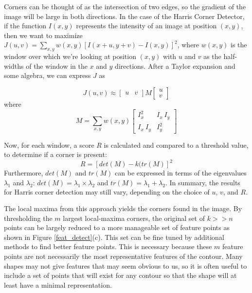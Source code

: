 \documentclass[paper=a4, fontsize=11pt]{scrartcl} %
\begin{document}
Corners can be thought of as the intersection of two edges, so the gradient of the image will be large in both directions. In the case of the Harris Corner Detector, if the function $I(x, y)$ represents the intensity of an image at position $(x, y)$, then we want to maximize $J(u, v) = \sum_{x,y} w(x, y) [I(x+u, y+v) - I(x, y)]^2$, where $w(x, y)$ is the window over which we’re looking at position $(x, y)$ with $u$ and $v$ as the half-widths of the window in the $x$ and $y$ directions. After a Taylor expansion and some algebra, we can express $J$ as 

$$
J(u, v) \approx \begin{bmatrix}
u & v
\end{bmatrix} M \begin{bmatrix}
u\\
v
\end{bmatrix}
$$
where
$$
M = \sum_{x,y} w(x, y) \begin{bmatrix}
I_x^2 & I_x~I_y \\ I_x~I_y & I_y^2
\end{bmatrix}
$$

Now, for each window, a score $R$ is calculated and compared to a threshold value, to determine if a corner is present:
$$
R = [det(M) - k(tr(M)]^2
$$
Furthermore, $det(M)$ and $tr(M)$ can be expressed in terms of the eigenvalues $\lambda_1$ and $\lambda_2$: $det(M) = \lambda_1 \times \lambda_2$ and $tr(M) = \lambda_1 + \lambda_2$. In summary, the results for Harris corner detection may still vary, depending on the choice of $u$, $v$, and $R$.

The local maxima from this approach yields the corners found in the image. By thresholding the $m$ largest local-maxima corners, the original set of $k >> n$ points can be largely reduced to a more manageable set of feature points as shown in Figure \ref{feat_detect}(c). This set can be fine tuned by additional methods to find better feature points. This is necessary because these $m$ feature points are not necessarily the most representative features of the contour. Many shapes may not give features that may seem obvious to us, so it is often useful to include a set of points that will exist for any contour so that the shape will at least have a minimal representation.  

\end{document}

